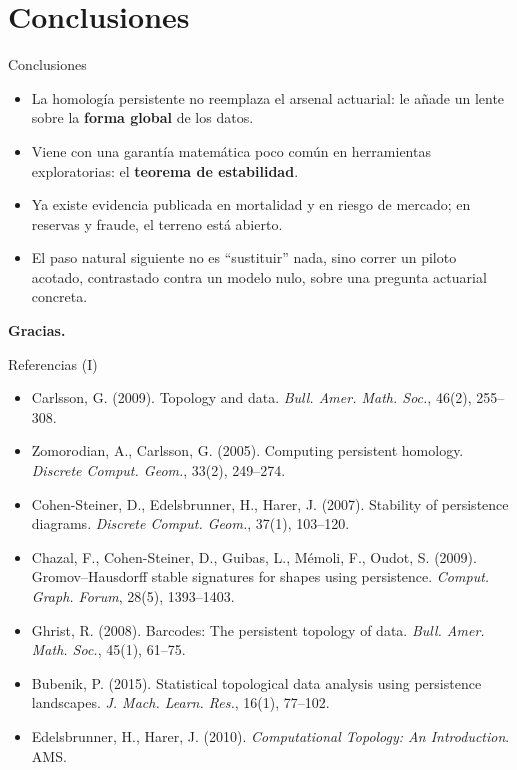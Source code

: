 \documentclass[aspectratio=169,11pt]{beamer}
\begin{document}
\section{Conclusiones}
\begin{frame}{Conclusiones}
  \begin{itemize}
    \item La homología persistente no reemplaza el arsenal actuarial: le
      añade un lente sobre la \textbf{forma global} de los datos.
    \item Viene con una garantía matemática poco común en herramientas
      exploratorias: el \textbf{teorema de estabilidad}.
    \item Ya existe evidencia publicada en mortalidad y en riesgo de
      mercado; en reservas y fraude, el terreno está abierto.
    \item El paso natural siguiente no es ``sustituir'' nada, sino correr
      un piloto acotado, contrastado contra un modelo nulo, sobre una
      pregunta actuarial concreta.
  \end{itemize}
  \vspace{1em}
  \begin{center}
    \Large\color{accent}\textbf{Gracias.}
  \end{center}
\end{frame}

\begin{frame}{Referencias (I)}
  \footnotesize
  \begin{itemize}
    \item Carlsson, G. (2009). Topology and data. \textit{Bull. Amer. Math. Soc.}, 46(2), 255--308.
    \item Zomorodian, A., Carlsson, G. (2005). Computing persistent homology. \textit{Discrete Comput. Geom.}, 33(2), 249--274.
    \item Cohen-Steiner, D., Edelsbrunner, H., Harer, J. (2007). Stability of persistence diagrams. \textit{Discrete Comput. Geom.}, 37(1), 103--120.
    \item Chazal, F., Cohen-Steiner, D., Guibas, L., Mémoli, F., Oudot, S. (2009). Gromov--Hausdorff stable signatures for shapes using persistence. \textit{Comput. Graph. Forum}, 28(5), 1393--1403.
    \item Ghrist, R. (2008). Barcodes: The persistent topology of data. \textit{Bull. Amer. Math. Soc.}, 45(1), 61--75.
    \item Bubenik, P. (2015). Statistical topological data analysis using persistence landscapes. \textit{J. Mach. Learn. Res.}, 16(1), 77--102.
    \item Edelsbrunner, H., Harer, J. (2010). \textit{Computational Topology: An Introduction}. AMS.
  \end{itemize}
\end{frame}
\end{document}
